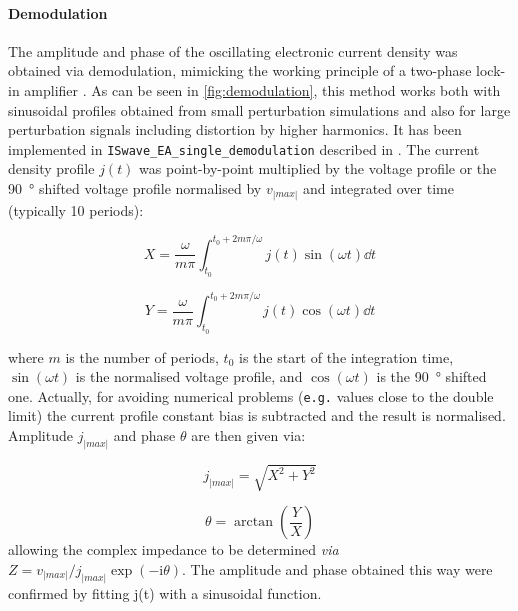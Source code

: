	\paragraph{Demodulation}
	The amplitude and phase of the oscillating electronic current density was obtained via
	demodulation, mimicking the working principle of a two-phase lock-in amplifier \cite{WikipediaLockIn}.
	As can be seen in \cref{fig:demodulation}, this method works both with sinusoidal profiles obtained from small perturbation simulations and also for large perturbation signals including distortion by higher harmonics.
	It has been implemented in \texttt{ISwave\_EA\_single\_demodulation} described in .
	The current density profile $j(t)$ was point-by-point multiplied by the voltage profile or the \SI{90}{\degree} shifted
	voltage profile normalised by $v_|max|$ and integrated over time (typically 10 periods):

	\begin{equation}
		X = \frac{\omega}{m \pi} \int_{t_0}^{t_0+2m\pi / \omega} j(t) \sin(\omega t) \dd t
	\end{equation}

	\begin{equation}
		Y = \frac{\omega}{m \pi} \int_{t_0}^{t_0+2m\pi / \omega} j(t) \cos(\omega t) \dd t
	\end{equation}

	where $m$ is the number of periods, $t_0$ is the start of the integration time, $\sin(\omega t)$ is the normalised voltage profile, and $\cos(\omega t)$ is the \SI{90}{\degree} shifted one.
	Actually, for avoiding numerical problems (\texttt{e.g.} values close to the double limit) the current profile constant bias is subtracted and the result is normalised.
	Amplitude $j_|max|$ and
	phase $\theta$ are then given via:

	\begin{equation}
		j_|max| = \sqrt{X^2 + Y^2}
	\end{equation}

	\begin{equation}
		\theta = \arctan(\frac{Y}{X})
	\end{equation}
	allowing the complex impedance to be determined \textsl{via} $Z = v_|max| / j_|max| \exp(-\mathrm{i}\theta)$.
	The amplitude and phase
	obtained this way were confirmed by fitting j(t) with a sinusoidal function.
	
	

